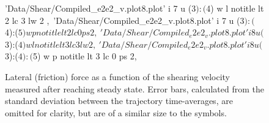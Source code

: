 \documentclass[aps,prb,reprint,superscriptaddress, a4paper]{revtex4-1}
\begin{document}
\begin{figure}
\begin{center}
\begin{gnuplot}[terminal=pdf, terminaloptions={size \SERFigwidth cm, \SERFigheight cm color solid}]
				'Data/Shear/Compiled_e2e2_v.plot8.plot' i 7 u ($3):($4) w l notitle  lt 2 lc 3 lw 2 ,\
				'Data/Shear/Compiled_e2e2_v.plot8.plot' i 7 u ($3):($4):($5) w p notitle  lt 2 lc 0 ps 2,\
				'Data/Shear/Compiled_e2e2_v.plot8.plot' i 8 u ($3):($4) w l notitle  lt 3 lc 3 lw 2 ,\
				'Data/Shear/Compiled_e2e2_v.plot8.plot' i 8 u ($3):($4):($5) w p notitle  lt 3 lc 0 ps 2,\
		\end{gnuplot}
		\caption{Lateral (friction) force as a function of the shearing velocity measured after reaching steady state. Error bars, calculated from the standard deviation between the trajectory time-averages, are omitted for clarity, but are of a similar size to the symbols.}
		\label{fig:FL_v1}
	\end{center}
 \end{figure}
\end{document}
